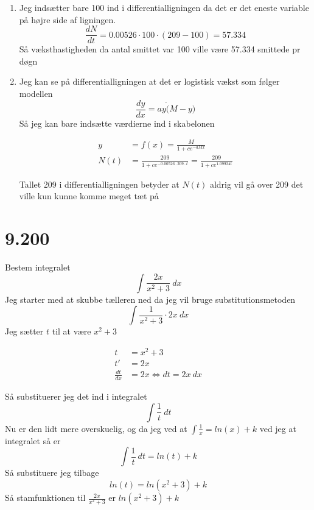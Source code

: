 \begin{enumerate}
\def\labelenumi{\arabic{enumi}.}
\item
  Jeg indsætter bare 100 ind i differentialligningen da det er det
  eneste variable på højre side af ligningen.
  \[\frac{dN}{dt}=0.00526 \cdot 100 \cdot (209 - 100) = 57.334\] Så
  væksthastigheden da antal smittet var 100 ville være 57.334 smittede
  pr døgn
\item
  Jeg kan se på differentialligningen at det er logistisk vækst som
  følger modellen \[\frac{dy}{dx}=ay \dot (M - y)\] Så jeg kan bare
  indsætte værdierne ind i skabelonen

  \begin{align*}
  y & = f(x) = \frac{M}{1+ce^{-aMx}}\\
  N(t) & = \frac{209}{1+ce^{-0.00526 \cdot 209 \cdot t}} = \frac{209}{1+ce^{1.09934t}}
  \end{align*}

  Tallet 209 i differentialligningen betyder at \(N(t)\) aldrig vil gå
  over 209 det ville kun kunne komme meget tæt på
\end{enumerate}

\section{9.200}\label{section-5}

Bestem integralet \[\int \frac{2x}{x^2+3} \ dx\] Jeg starter med at
skubbe tælleren ned da jeg vil bruge substitutionsmetoden
\[\int \frac{1}{x^2+3} \cdot 2x \ dx\] Jeg sætter \(t\) til at være
\(x^2+3\)

\begin{align*}
t & = x^2+3\\
t' & = 2x\\
\frac{dt}{dx} & = 2x \Leftrightarrow dt = 2x \ dx
\end{align*}

Så substituerer jeg det ind i integralet \[\int \frac{1}{t} \ dt\] Nu er
den lidt mere overskuelig, og da jeg ved at
\(\int \frac{1}{x} = ln(x)+k\) ved jeg at integralet så er
\[\int \frac{1}{t} \ dt = ln(t)+k\] Så substituere jeg tilbage
\[ln(t) = ln(x^2+3)+k\] Så stamfunktionen til \(\frac{2x}{x^2+3}\) er
\(ln(x^2+3)+k\)
